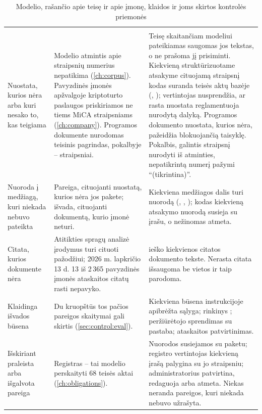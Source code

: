 \begin{xltabular}{\textwidth}{@{}L{34mm}YL{50mm}@{}}
\caption{Modelio, rašančio apie teisę ir apie įmonę, klaidos ir joms skirtos kontrolės priemonės}\label{tab:control:risks}\\
\toprule
{} &  &  \\
\midrule
\endfirsthead
\toprule
{} &  &  \\
\midrule
\endhead
\bottomrule
\endlastfoot
Nuostata, kurios nėra arba kuri nesako to, kas teigiama & Modelio atmintis apie straipsnių numerius nepatikima (\cref{ch:corpus}). Pavyzdinės įmonės apžvalgoje kriptoturto paslaugos priskiriamos ne tiems MiCA straipsniams (\cref{ch:company}). Programos dokumente nurodomas teisinis pagrindas, pokalbyje -- straipsniai. & Teisę skaitančiam modeliui pateikiamas saugomas jos tekstas, o ne prašoma jį prisiminti. Kiekvieną struktūrizuotame atsakyme cituojamą straipsnį kodas suranda teisės aktų bazėje (, ); vertintojas  nusprendžia, ar rasta nuostata reglamentuoja nurodytą dalyką. Programos dokumento nuostata, kurios nėra, pažeidžia blokuojančią taisyklę. Pokalbis, galintis straipsnį nurodyti iš atminties, nepatikrintą numerį pažymi \enquote{(tikrintina)}. \\
Nuoroda į medžiagą, kuri niekada nebuvo pateikta & Pareiga, cituojanti nuostatą, kurios nėra jos pakete; išvada, cituojanti dokumentą, kurio įmonė neturi. & Kiekviena medžiagos dalis turi nuorodą (, , ); kodas kiekvieną atsakymo nuorodą susieja su įrašu, o nežinomas atmeta. \\
Citata, kurios dokumente nėra & Atitikties spragų analizė įrodymus turi cituoti pažodžiui; 2026 m. lapkričio 13 d. 13 iš 2\,365 pavyzdinės įmonės ataskaitos citatų rasti nepavyko. &  ieško kiekvienos citatos dokumento tekste. Nerasta citata išsaugoma be vietos ir taip parodoma. \\
Klaidinga išvados būsena & Du kruopštūs tos pačios pareigos skaitymai gali skirtis (\cref{sec:control:eval}). & Kiekviena būsena instrukcijoje apibrėžta sąlyga; rinkinys ; peržiūrėtojo sprendimas su pastaba; ataskaitos patvirtinimas. \\
Išskiriant praleista arba išgalvota pareiga & Registras -- tai modelio perskaityti 68 teisės aktai (\cref{ch:obligations}). & Nuorodos susiejamos su paketu; registro vertintojas kiekvieną įrašą palygina su jo straipsniu; administratorius patvirtina, redaguoja arba atmeta. Niekas neranda pareigos, kuri niekada nebuvo užrašyta. \\

\end{xltabular}
